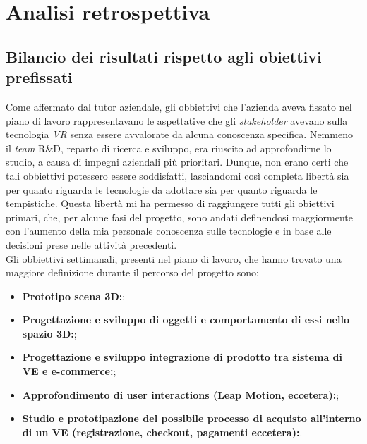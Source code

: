 \newpage
\chapter{Analisi retrospettiva}
\label{cap:analisiretrospettiva}

\section{Bilancio dei risultati rispetto agli obiettivi prefissati}

Come affermato dal tutor aziendale, gli obbiettivi che l'azienda aveva fissato nel piano di lavoro rappresentavano le aspettative che gli \textit{stakeholder}\hyperlink{sh}{} avevano sulla tecnologia \textit{VR} senza essere avvalorate da alcuna conoscenza specifica. Nemmeno il \textit{team} R\&D, reparto di ricerca e sviluppo, era riuscito ad approfondirne lo studio, a causa di impegni aziendali più prioritari. Dunque, non erano certi che tali obbiettivi potessero essere soddisfatti, lasciandomi così completa libertà sia per quanto riguarda le tecnologie da adottare sia per quanto riguarda le tempistiche. Questa libertà mi ha permesso di raggiungere tutti gli obiettivi primari, che, per alcune fasi del progetto, sono andati definendosi maggiormente con l'aumento della mia personale conoscenza sulle tecnologie e in base alle decisioni prese nelle attività precedenti. \\
Gli obbiettivi settimanali, presenti nel piano di lavoro, che hanno trovato una maggiore definizione durante il percorso del progetto sono:

\begin{itemize}
	\item \textbf{Prototipo scena 3D:};
	\item \textbf{Progettazione e sviluppo di oggetti e comportamento di essi nello spazio 3D:};
	\item \textbf{Progettazione e sviluppo integrazione di prodotto tra sistema di VE e e-commerce:};
	\item \textbf{Approfondimento di user interactions (Leap Motion, eccetera):};
	\item \textbf{Studio e prototipazione del possibile processo di acquisto all’interno di un VE (registrazione, checkout, pagamenti eccetera):}.
\end{itemize} 

